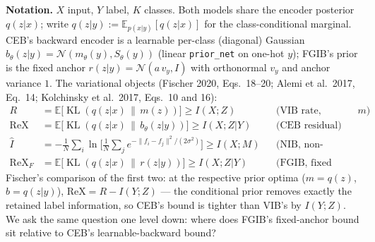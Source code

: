 
\newtheorem{lemma}{Lemma}
\newtheorem{proposition}{Proposition}
\newtheorem{remark}{Remark}

\textbf{Notation.}
$X$ input, $Y$ label, $K$ classes.
Both models share the encoder posterior $q(z|x)$; write
$q(z|y) := \mathbb{E}_{p(x|y)}[q(z|x)]$ for the class-conditional marginal.
CEB's backward encoder is a learnable per-class (diagonal) Gaussian
$b_\theta(z|y) = \mathcal{N}(m_\theta(y), S_\theta(y))$ (linear \texttt{prior\_net} on
one-hot $y$); FGIB's prior is the fixed anchor $r(z|y) = \mathcal{N}(a\,v_y, I)$ with
orthonormal $v_y$ and anchor variance $1$.
The variational objects (Fischer 2020, Eqs.~18--20; Alemi et al.\ 2017, Eq.~14;
Kolchinsky et al.\ 2017, Eqs.~10 and 16):
\begin{align*}
R &= \mathbb{E}\big[\operatorname{KL}(q(z|x)\,\|\,m(z))\big] \ge I(X;Z)
&&\text{(VIB rate, marginal prior $m$)} \\
\mathrm{ReX} &= \mathbb{E}\big[\operatorname{KL}(q(z|x)\,\|\,b_\theta(z|y))\big]
\ge I(X;Z|Y)
&&\text{(CEB residual)} \\
\widehat I &= -\frac{1}{N}\sum_i \ln\Big[\frac{1}{N}\sum_j
e^{-\|f_i-f_j\|^2/(2\sigma^2)}\Big] \ge I(X;M)
&&\text{(NIB, non-parametric; Eq.~16, the homoscedastic case of Eq.~10)} \\
\mathrm{ReX}_F &= \mathbb{E}\big[\operatorname{KL}(q(z|x)\,\|\,r(z|y))\big]
\ge I(X;Z|Y)
&&\text{(FGIB, fixed anchor)}
\end{align*}
Fischer's comparison of the first two: at the respective prior optima
($m = q(z)$, $b = q(z|y)$), $\mathrm{ReX} = R - I(Y;Z)$ --- the conditional prior removes
exactly the retained label information, so CEB's bound is tighter than VIB's by
$I(Y;Z)$. We ask the same question one level down: where does FGIB's fixed-anchor bound
sit relative to CEB's learnable-backward bound?

